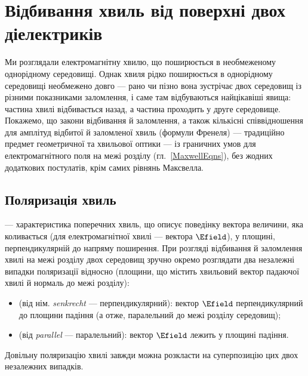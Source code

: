 \section{Відбивання хвиль від поверхні двох діелектриків}

Ми розглядали електромагнітну хвилю, що поширюється в необмеженому однорідному середовищі. Однак хвиля рідко поширюється в однорідному середовищі необмежено довго --- рано чи пізно вона зустрічає  двох середовищ із різними показниками заломлення, і саме там відбуваються найцікавіші явища: частина хвилі відбивається назад, а частина проходить у друге середовище. Покажемо, що закони відбивання й заломлення, а також кількісні співвідношення для амплітуд відбитої й заломленої хвиль (формули Френеля) --- традиційно предмет геометричної та хвильової оптики ---  із граничних умов для електромагнітного поля на межі розділу (гл.~\ref{MaxwellEqns}), без жодних додаткових постулатів, крім самих рівнянь Максвелла.

\subsection*{Поляризація хвиль}

 --- характеристика поперечних хвиль, що описує поведінку вектора величини, яка коливається (для електромагнітної хвилі ---
вектора $\Efield$), у площині, перпендикулярній до напряму поширення. При розгляді відбивання й заломлення хвилі на межі розділу двох середовищ
зручно окремо розглядати два незалежні випадки поляризації відносно  (площини, що містить хвильовий вектор падаючої хвилі
й нормаль до межі розділу):
\begin{itemize}
	\item {} (від нім. \emph{senkrecht} --- перпендикулярний): вектор $\Efield$ перпендикулярний до площини падіння (а
	      отже, паралельний до межі розділу середовищ);
	\item {} (від \emph{parallel} --- паралельний): вектор $\Efield$ лежить у площині падіння.
\end{itemize}
Довільну поляризацію хвилі завжди можна розкласти на суперпозицію цих двох незалежних випадків.

